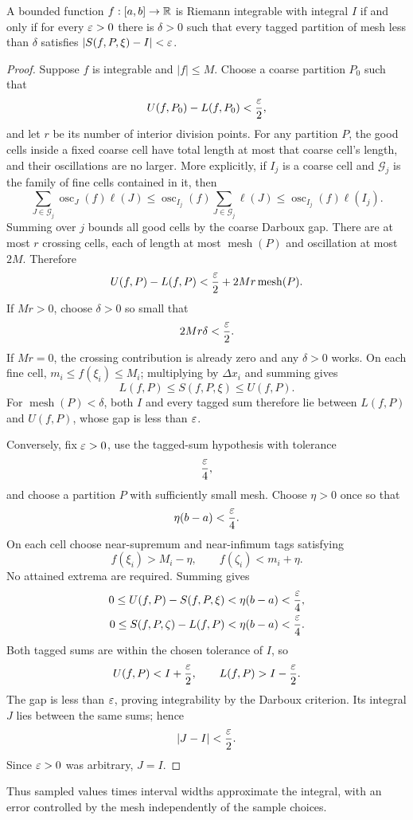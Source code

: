\begin{theorem}
\label{thm:tagged-riemann}
A bounded function $f:[a,b]\to\mathbb{R}$ is Riemann integrable with integral $I$
if and only if for every $\varepsilon>0$ there is $\delta>0$ such that every tagged
partition of mesh less than $\delta$ satisfies $|S(f,P,\xi)-I|<\varepsilon$.
\end{theorem}
\begin{proof}
Suppose $f$ is integrable and $|f|\leq M$. Choose a coarse partition
$P_0$ such that
\[
U(f,P_0)-L(f,P_0)<\frac{\varepsilon}2,
\]
and let $r$ be its number of interior division points. For any partition
$P$, the good cells inside a fixed coarse cell have total length at most
that coarse cell's length, and their oscillations are no larger. More
explicitly, if $I_j$ is a coarse cell and $\mathcal G_j$ is the family of
fine cells contained in it, then
\[
\sum_{J\in\mathcal G_j}\operatorname{osc}_J(f)\ell(J)
\leq\operatorname{osc}_{I_j}(f)
\sum_{J\in\mathcal G_j}\ell(J)
\leq\operatorname{osc}_{I_j}(f)\ell(I_j).
\]
Summing over $j$ bounds all good cells by the coarse Darboux gap. There are
at most $r$ crossing cells, each of length at most $\operatorname{mesh}(P)$ and oscillation
at most $2M$. Therefore
\[
U(f,P)-L(f,P)<\frac{\varepsilon}2+2Mr\operatorname{mesh}(P).
\]
If $Mr>0$, choose $\delta>0$ so small that
\[
2Mr\delta<\frac{\varepsilon}2.
\]
If $Mr=0$, the crossing contribution is already zero and any $\delta>0$
works. On each fine cell, $m_i\leq f(\xi_i)\leq M_i$; multiplying by
$\Delta x_i$ and summing gives
\[
L(f,P)\leq S(f,P,\xi)\leq U(f,P).
\]
For $\operatorname{mesh}(P)<\delta$, both $I$ and every tagged sum therefore
lie between $L(f,P)$ and $U(f,P)$, whose gap is less than $\varepsilon$.

Conversely, fix $\varepsilon>0$, use the tagged-sum hypothesis with tolerance
\[
\frac{\varepsilon}4,
\]
and choose a partition $P$ with sufficiently small mesh. Choose $\eta>0$
once so that
\[
\eta(b-a)<\frac{\varepsilon}4.
\]
On each cell choose near-supremum and near-infimum tags satisfying
\[
f(\xi_i)>M_i-\eta,\qquad f(\zeta_i)<m_i+\eta.
\]
No attained extrema are required. Summing gives
\[
\begin{aligned}
0\leq U(f,P)-S(f,P,\xi)&<\eta(b-a)<\frac{\varepsilon}4,\\
0\leq S(f,P,\zeta)-L(f,P)&<\eta(b-a)<\frac{\varepsilon}4.
\end{aligned}
\]
Both tagged sums are within the chosen tolerance of $I$, so
\[
U(f,P)<I+\frac{\varepsilon}2,\qquad L(f,P)>I-\frac{\varepsilon}2.
\]
The gap is less than $\varepsilon$, proving integrability by the Darboux
criterion. Its integral $J$ lies between the same sums; hence
\[
|J-I|<\frac{\varepsilon}2.
\]
Since $\varepsilon>0$ was arbitrary, $J=I$.
\end{proof}
Thus sampled values times interval widths approximate the integral, with
an error controlled by the mesh independently of the sample choices.

